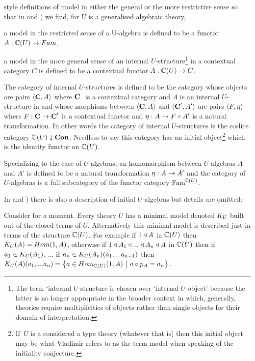 {style  definitions of model in either the general or the more restrictive sense so that in 
\cite{Cartmell78} and  \cite{Cartmell86}) we find,
for $U$ is a generalised algebraic theory, 
\begin{point}
 a model in the restricted sense of a U-algebra is defined to be a functor $A: \ccat[C](U) \morph Fam$, 
\end{point}
\begin{point}
a model in the more general sense of an internal $U$-structure\footnote{The  term `internal $U$-structure is chosen over `internal $U$-object' because the latter
is no longer appropriate in the broader context in which, generally, theories require multiplicities of objects rather than single objects for their domain of interpretation.} in a contextual category
$C$ is defined to be a contextual functor $A: \ccat[C](U) \morph C$.
\end{point}
The category of internal $U$-structures is defined to be the category whose objects
are pairs $\tuple{\catc,A}$ 
where $\catcw$ is a contextual 
category and $A$ is an internal 
$U$-structure in
 \catcw and whose morphisms between $\tuple{\catc,A}$ and $\tuple{\catc',A'}$ are pairs $\tuple{F, \eta}$ where
$F: \catc \morph \catc'$ is a contextual functor and $\eta: A  \morph  F \circ A'$ is a natural transformation.
In other words the category of internal $U$-structures
is  the coslice category
$\CofU \downarrow \catCon$. Needless to say this category has an initial object\footnote{If\ $U$ is a considered a type theory (whatever that is) then 
this initial object may be what Vladimir  refers
to as the term model when speaking of the initiality conjecture.}
which is the identity functor on  $\CofU$.
 
Specialising to the case of $U$-algebras,  an homomorphism between $U$-algebras $A$ and $A'$ is defined to be a 
natural transformation $\eta: A \morph A'$ and the category of $U$-algebras is a full subcategory of the 
functor category $\Fam^{\CofU}$. 

\note 
In \cite{Cartmell78} and  \cite{Cartmell86}) there is also a description of initial $U$-algebras but details are omitted:
\begin{tightquote}
Consider for a moment. Every theory $U$ has a minimal model denoted $\KU$ built out of the closed terms of $U$. Alternatively this minimal model is described just in terms of the structure $\CofU$. For example
if $1 \base A$ in $\CofU$ then 
$\KU(A)=Hom(1,A)$, otherwise if $1 \base A_1 \base ... \base A_n \base A$ in $\CofU$
then if $a_1 \in \KU(A_1)$, ... if $a_n \in \KU(A_n)(a_1,...a_{n-1})$ then 
$\KU(A)(a_1,...a_n)=\setsuchthat{a\in Hom_{\CofU}(1,A)}{a \circ p_A = a_n}$. \\
\end{tightquote} 

}
